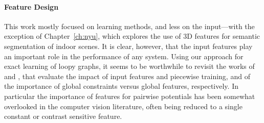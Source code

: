 \documentclass[12pt,toc=bibnumbered, a4paper,twoside,DIV=11,BCOR=.5cm]{scrbook}
\begin{document}
\paragraph{Feature Design}
This work mostly focused on learning methods, and less on the input---with
the exception of Chapter~\ref{ch:nyu}, which explores the use of 3D features
for semantic segmentation of indoor scenes. It is clear, however, that
the input features play an important role in the performance of any system.
Using our approach for exact learning of loopy graphs, it seems to be worthwhile to
revisit the works of \citet{nowozin2010parameter} and \citet{lucchi2011spatial},
that evaluate the impact of input features and piecewise training, and of the importance
of global constraints versus global features, respectively.
In particular the importance of features for pairwise potentials has been
somewhat overlooked in the computer vision literature, often being reduced to a
single constant or contrast sensitive feature.



\end{document}

